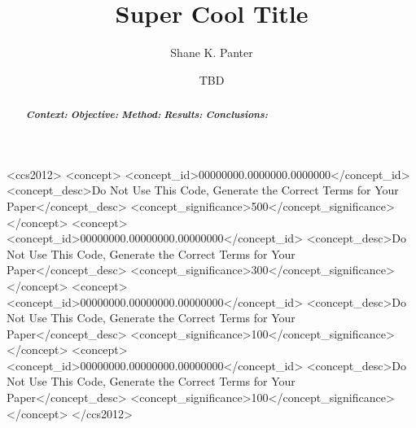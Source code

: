 \documentclass[sigconf,review,anonymous]{acmart}
\begin{document}
\title{Super Cool Title}

\author{Shane K. Panter}

\author{TBD}

\begin{abstract}
  \textit{\textbf{Context:}}
  \textit{\textbf{Objective:}}
  \textit{\textbf{Method:}}
  \textit{\textbf{Results:}}
  \textit{\textbf{Conclusions:}}
\end{abstract}

\begin{CCSXML}
<ccs2012>
 <concept>
  <concept_id>00000000.0000000.0000000</concept_id>
  <concept_desc>Do Not Use This Code, Generate the Correct Terms for Your Paper</concept_desc>
  <concept_significance>500</concept_significance>
 </concept>
 <concept>
  <concept_id>00000000.00000000.00000000</concept_id>
  <concept_desc>Do Not Use This Code, Generate the Correct Terms for Your Paper</concept_desc>
  <concept_significance>300</concept_significance>
 </concept>
 <concept>
  <concept_id>00000000.00000000.00000000</concept_id>
  <concept_desc>Do Not Use This Code, Generate the Correct Terms for Your Paper</concept_desc>
  <concept_significance>100</concept_significance>
 </concept>
 <concept>
  <concept_id>00000000.00000000.00000000</concept_id>
  <concept_desc>Do Not Use This Code, Generate the Correct Terms for Your Paper</concept_desc>
  <concept_significance>100</concept_significance>
 </concept>
</ccs2012>
\end{CCSXML}




\maketitle
\end{document}

